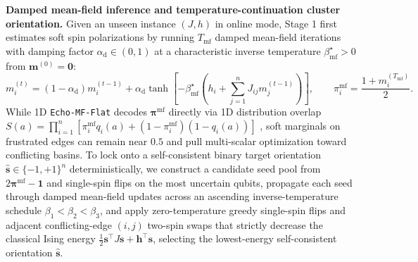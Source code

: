 \documentclass[10pt,a4paper]{article}
\begin{document}
\textbf{Damped mean-field inference and temperature-continuation cluster orientation.} Given an unseen instance $(J, h)$ in online mode, Stage 1 first estimates soft spin polarizations by running $T_{\mathrm{mf}}$ damped mean-field iterations \citep{wainwright2008graphical} with damping factor $\alpha_{\mathrm{d}} \in (0, 1)$ at a characteristic inverse temperature $\beta_{\mathrm{mf}}^\star > 0$ from $\boldsymbol{m}^{(0)} = \mathbf{0}$:
\[
m_i^{(t)} = (1 - \alpha_{\mathrm{d}}) m_i^{(t-1)} + \alpha_{\mathrm{d}} \tanh\!\left[-\beta_{\mathrm{mf}}^\star\left(h_i + \sum_{j=1}^n J_{ij} m_j^{(t-1)}\right)\right], \qquad \pi_i^{\mathrm{mf}} = \frac{1 + m_i^{(T_{\mathrm{mf}})}}{2}.
\]
While 1D \texttt{Echo-MF-Flat} decodes $\boldsymbol{\pi}^{\mathrm{mf}}$ directly via 1D distribution overlap $S(a) = \prod_{i=1}^n [\pi_i^{\mathrm{mf}} q_i(a) + (1 - \pi_i^{\mathrm{mf}})(1 - q_i(a))]$ \citep{yao2026echo}, soft marginals on frustrated edges can remain near $0.5$ and pull multi-scalar optimization toward conflicting basins. To lock onto a self-consistent binary target orientation $\hat{\boldsymbol{s}} \in \{-1, +1\}^n$ deterministically, we construct a candidate seed pool from $2\boldsymbol{\pi}^{\mathrm{mf}} - \mathbf{1}$ and single-spin flips on the most uncertain qubits, propagate each seed through damped mean-field updates across an ascending inverse-temperature schedule $\beta_1 < \beta_2 < \beta_3$, and apply zero-temperature greedy single-spin flips and adjacent conflicting-edge $(i, j)$ two-spin swaps that strictly decrease the classical Ising energy $\frac{1}{2}\boldsymbol{s}^\top J\boldsymbol{s} + \boldsymbol{h}^\top\boldsymbol{s}$, selecting the lowest-energy self-consistent orientation $\hat{\boldsymbol{s}}$.
\end{document}
